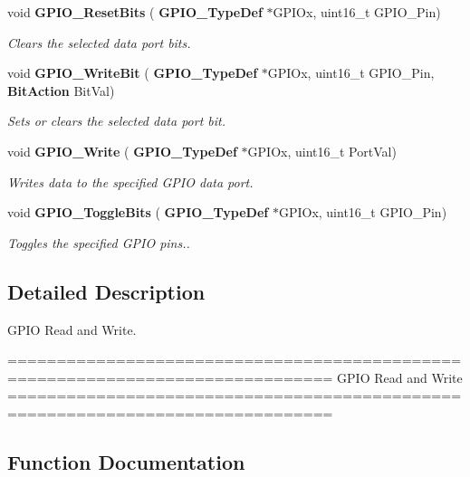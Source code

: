\begin{DoxyCompactItemize}
void \textbf{ G\+P\+I\+O\+\_\+\+Reset\+Bits} (\textbf{ G\+P\+I\+O\+\_\+\+Type\+Def} $\ast$G\+P\+I\+Ox, uint16\+\_\+t G\+P\+I\+O\+\_\+\+Pin)
\begin{DoxyCompactList}\small\item\em Clears the selected data port bits. \end{DoxyCompactList}\item 
void \textbf{ G\+P\+I\+O\+\_\+\+Write\+Bit} (\textbf{ G\+P\+I\+O\+\_\+\+Type\+Def} $\ast$G\+P\+I\+Ox, uint16\+\_\+t G\+P\+I\+O\+\_\+\+Pin, \textbf{ Bit\+Action} Bit\+Val)
\begin{DoxyCompactList}\small\item\em Sets or clears the selected data port bit. \end{DoxyCompactList}\item 
void \textbf{ G\+P\+I\+O\+\_\+\+Write} (\textbf{ G\+P\+I\+O\+\_\+\+Type\+Def} $\ast$G\+P\+I\+Ox, uint16\+\_\+t Port\+Val)
\begin{DoxyCompactList}\small\item\em Writes data to the specified G\+P\+IO data port. \end{DoxyCompactList}\item 
void \textbf{ G\+P\+I\+O\+\_\+\+Toggle\+Bits} (\textbf{ G\+P\+I\+O\+\_\+\+Type\+Def} $\ast$G\+P\+I\+Ox, uint16\+\_\+t G\+P\+I\+O\+\_\+\+Pin)
\begin{DoxyCompactList}\small\item\em Toggles the specified G\+P\+IO pins.. \end{DoxyCompactList}\end{DoxyCompactItemize}


\subsection{Detailed Description}
G\+P\+IO Read and Write. 

\begin{DoxyVerb} ===============================================================================
                              GPIO Read and Write
 ===============================================================================  \end{DoxyVerb}
 

\subsection{Function Documentation}
\mbox{\label{group__GPIO__Group2_ga139a33adc8409288e9f193bbebb5a0f7}} 
